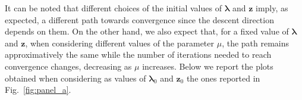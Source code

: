 \documentclass[a4paper,11pt]{article}
\begin{document}
\noindent It can be noted that different choices of the initial values of $\boldsymbol{\lambda}$ and $\textbf{z}$ imply, as expected, a different path towards convergence since the descent direction depends on them. On the other hand, we also expect that, for a fixed value of $\boldsymbol{\lambda}$ and $\textbf{z}$, when considering different values of the parameter $\mu$, the path remains approximatively the same while the number of iterations needed to reach convergence changes, decreasing as $\mu$ increases. Below we report the plots obtained when considering as values of $\boldsymbol{\lambda}_{0}$ and $\textbf{z}_{0}$ the ones reported in Fig.~\ref{fig:panel_a}.
\end{document}
